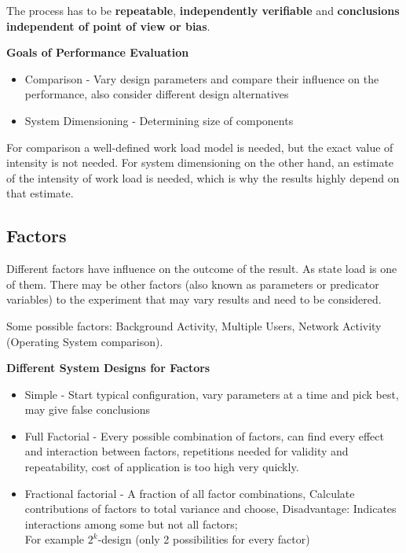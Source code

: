The process has to be \textbf{repeatable}, \textbf{independently verifiable} and \textbf{conclusions independent of point of view or bias}.

\textbf{Goals of Performance Evaluation}

\begin{itemize}
    \item Comparison - Vary design parameters and compare their influence on the performance, also consider different design alternatives
    \item System Dimensioning - Determining size of components
\end{itemize}

For comparison a well-defined work load model is needed, but the exact value of intensity is not needed. For system dimensioning on the other hand, an estimate of the intensity of work load is needed, which is why the results highly depend on that estimate.

\subsection{Factors}

Different factors have influence on the outcome of the result. As state load is one of them. There may be other factors (also known as parameters or predicator variables) to the experiment that may vary results and need to be considered.

Some possible factors: Background Activity, Multiple Users, Network Activity (Operating System comparison).

\textbf{Different System Designs for Factors}

\begin{itemize}
    \item Simple - Start typical configuration, vary parameters at a time and pick best, may give false conclusions
    \item Full Factorial - Every possible combination of factors, can find every effect and interaction between factors, repetitions needed for validity and repeatability, cost of application is too high very quickly.
    \item Fractional factorial - A fraction of all factor combinations, Calculate contributions of factors to total variance and choose, Disadvantage: Indicates interactions among some but not all factors;\\ For example $2^k$-design (only 2 possibilities for every factor) 
\end{itemize}

